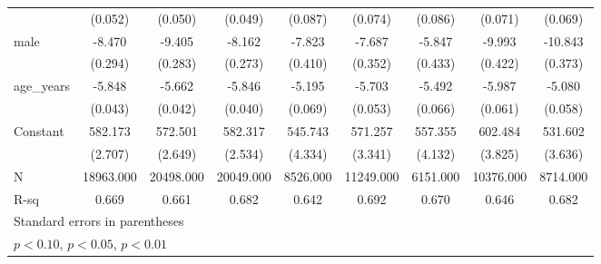 \begin{table}[htbp]
\begin{tabular}{l*{8}{c}}
                    &     (0.052)         &     (0.050)         &     (0.049)         &     (0.087)         &     (0.074)         &     (0.086)         &     (0.071)         &     (0.069)         \\
[1em]
male                &      -8.470\sym{***}&      -9.405\sym{***}&      -8.162\sym{***}&      -7.823\sym{***}&      -7.687\sym{***}&      -5.847\sym{***}&      -9.993\sym{***}&     -10.843\sym{***}\\
                    &     (0.294)         &     (0.283)         &     (0.273)         &     (0.410)         &     (0.352)         &     (0.433)         &     (0.422)         &     (0.373)         \\
[1em]
age\_years           &      -5.848\sym{***}&      -5.662\sym{***}&      -5.846\sym{***}&      -5.195\sym{***}&      -5.703\sym{***}&      -5.492\sym{***}&      -5.987\sym{***}&      -5.080\sym{***}\\
                    &     (0.043)         &     (0.042)         &     (0.040)         &     (0.069)         &     (0.053)         &     (0.066)         &     (0.061)         &     (0.058)         \\
[1em]
Constant            &     582.173\sym{***}&     572.501\sym{***}&     582.317\sym{***}&     545.743\sym{***}&     571.257\sym{***}&     557.355\sym{***}&     602.484\sym{***}&     531.602\sym{***}\\
                    &     (2.707)         &     (2.649)         &     (2.534)         &     (4.334)         &     (3.341)         &     (4.132)         &     (3.825)         &     (3.636)         \\
\hline
N                   &   18963.000         &   20498.000         &   20049.000         &    8526.000         &   11249.000         &    6151.000         &   10376.000         &    8714.000         \\
R-sq                &       0.669         &       0.661         &       0.682         &       0.642         &       0.692         &       0.670         &       0.646         &       0.682         \\
\hline\hline
\multicolumn{9}{l}{\footnotesize Standard errors in parentheses}\\
\multicolumn{9}{l}{\footnotesize \sym{*} \(p<0.10\), \sym{**} \(p<0.05\), \sym{***} \(p<0.01\)}\\
\end{tabular}
\end{table}
